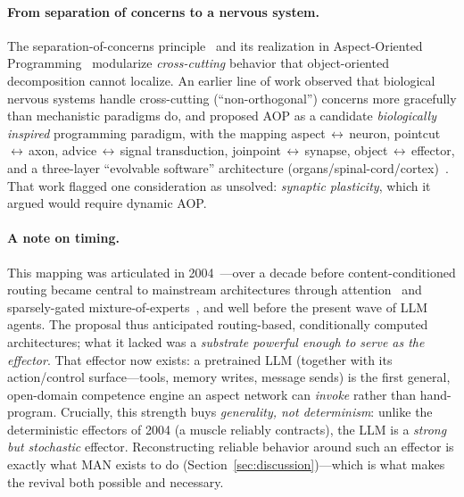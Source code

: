 \documentclass[11pt]{article}
\theoremstyle{definition}
\begin{document}
\paragraph{From separation of concerns to a nervous system.}
The separation-of-concerns principle~\citep{dijkstra1976} and its
realization in Aspect-Oriented Programming~\citep{kiczales1997} modularize
\emph{cross-cutting} behavior that object-oriented decomposition cannot
localize. An earlier line of work observed that biological nervous systems
handle cross-cutting (``non-orthogonal'') concerns more gracefully than
mechanistic paradigms do, and proposed AOP as a candidate
\emph{biologically inspired} programming paradigm, with the mapping
aspect\,$\leftrightarrow$\,neuron, pointcut\,$\leftrightarrow$\,axon,
advice\,$\leftrightarrow$\,signal transduction,
joinpoint\,$\leftrightarrow$\,synapse, object\,$\leftrightarrow$\,effector,
and a three-layer ``evolvable software'' architecture
(organs/spinal-cord/cortex)~\citep{wang2004waosd}. That work flagged one
consideration as unsolved: \emph{synaptic plasticity}, which it argued would
require dynamic AOP.

\paragraph{A note on timing.}
This mapping was articulated in 2004~\citep{wang2004waosd}---over a decade
before content-conditioned routing became central to mainstream architectures
through attention~\citep{vaswani2017} and sparsely-gated
mixture-of-experts~\citep{shazeer2017}, and well before the present wave of
LLM agents. The proposal thus anticipated routing-based, conditionally
computed architectures; what it lacked was a \emph{substrate powerful enough
to serve as the effector}. That effector now exists: a pretrained LLM
(together with its action/control surface---tools, memory writes, message
sends) is the first general, open-domain competence engine an aspect network
can \emph{invoke} rather than hand-program. Crucially, this strength buys
\emph{generality, not determinism}: unlike the deterministic effectors of
2004 (a muscle reliably contracts), the LLM is a \emph{strong but stochastic}
effector. Reconstructing reliable behavior around such an effector is exactly
what MAN exists to do (Section~\ref{sec:discussion})---which is what makes the
revival both possible and necessary.
\end{document}
